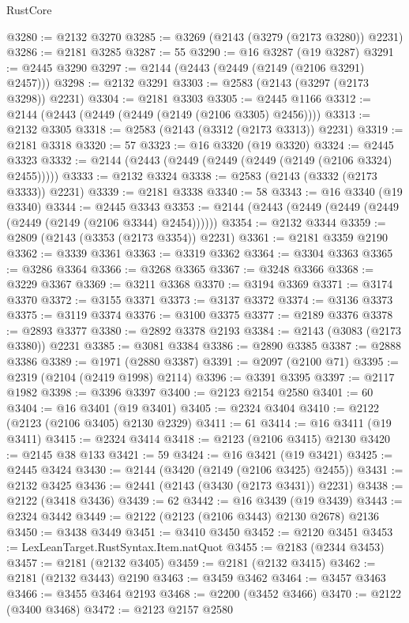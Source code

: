 \begin{lexlean}{RustCore}
\begin{coremodule}
@3280 := @2132 @3270
@3285 := @3269 (@2143 (@3279 (@2173 @3280)) @2231)
@3286 := @2181 @3285
@3287 := 55
@3290 := @16 @3287 (@19 @3287)
@3291 := @2445 @3290
@3297 := @2144 (@2443 (@2449 (@2149 (@2106 @3291) @2457)))
@3298 := @2132 @3291
@3303 := @2583 (@2143 (@3297 (@2173 @3298)) @2231)
@3304 := @2181 @3303
@3305 := @2445 @1166
@3312 := @2144 (@2443 (@2449 (@2449 (@2149 (@2106 @3305) @2456))))
@3313 := @2132 @3305
@3318 := @2583 (@2143 (@3312 (@2173 @3313)) @2231)
@3319 := @2181 @3318
@3320 := 57
@3323 := @16 @3320 (@19 @3320)
@3324 := @2445 @3323
@3332 := @2144 (@2443 (@2449 (@2449 (@2449 (@2149 (@2106 @3324) @2455)))))
@3333 := @2132 @3324
@3338 := @2583 (@2143 (@3332 (@2173 @3333)) @2231)
@3339 := @2181 @3338
@3340 := 58
@3343 := @16 @3340 (@19 @3340)
@3344 := @2445 @3343
@3353 := @2144 (@2443 (@2449 (@2449 (@2449 (@2449 (@2149 (@2106 @3344) @2454))))))
@3354 := @2132 @3344
@3359 := @2809 (@2143 (@3353 (@2173 @3354)) @2231)
@3361 := @2181 @3359 @2190
@3362 := @3339 @3361
@3363 := @3319 @3362
@3364 := @3304 @3363
@3365 := @3286 @3364
@3366 := @3268 @3365
@3367 := @3248 @3366
@3368 := @3229 @3367
@3369 := @3211 @3368
@3370 := @3194 @3369
@3371 := @3174 @3370
@3372 := @3155 @3371
@3373 := @3137 @3372
@3374 := @3136 @3373
@3375 := @3119 @3374
@3376 := @3100 @3375
@3377 := @2189 @3376
@3378 := @2893 @3377
@3380 := @2892 @3378 @2193
@3384 := @2143 (@3083 (@2173 @3380)) @2231
@3385 := @3081 @3384
@3386 := @2890 @3385
@3387 := @2888 @3386
@3389 := @1971 (@2880 @3387)
@3391 := @2097 (@2100 @71)
@3395 := @2319 (@2104 (@2419 @1998) @2114)
@3396 := @3391 @3395
@3397 := @2117 @1982
@3398 := @3396 @3397
@3400 := @2123 @2154 @2580
@3401 := 60
@3404 := @16 @3401 (@19 @3401)
@3405 := @2324 @3404
@3410 := @2122 (@2123 (@2106 @3405) @2130 @2329)
@3411 := 61
@3414 := @16 @3411 (@19 @3411)
@3415 := @2324 @3414
@3418 := @2123 (@2106 @3415) @2130
@3420 := @2145 @38 @133
@3421 := 59
@3424 := @16 @3421 (@19 @3421)
@3425 := @2445 @3424
@3430 := @2144 (@3420 (@2149 (@2106 @3425) @2455))
@3431 := @2132 @3425
@3436 := @2441 (@2143 (@3430 (@2173 @3431)) @2231)
@3438 := @2122 (@3418 @3436)
@3439 := 62
@3442 := @16 @3439 (@19 @3439)
@3443 := @2324 @3442
@3449 := @2122 (@2123 (@2106 @3443) @2130 @2678) @2136
@3450 := @3438 @3449
@3451 := @3410 @3450
@3452 := @2120 @3451
@3453 := LexLeanTarget.RustSyntax.Item.natQuot
@3455 := @2183 (@2344 @3453)
@3457 := @2181 (@2132 @3405)
@3459 := @2181 (@2132 @3415)
@3462 := @2181 (@2132 @3443) @2190
@3463 := @3459 @3462
@3464 := @3457 @3463
@3466 := @3455 @3464 @2193
@3468 := @2200 (@3452 @3466)
@3470 := @2122 (@3400 @3468)
@3472 := @2123 @2157 @2580

\end{coremodule}
\end{lexlean}
